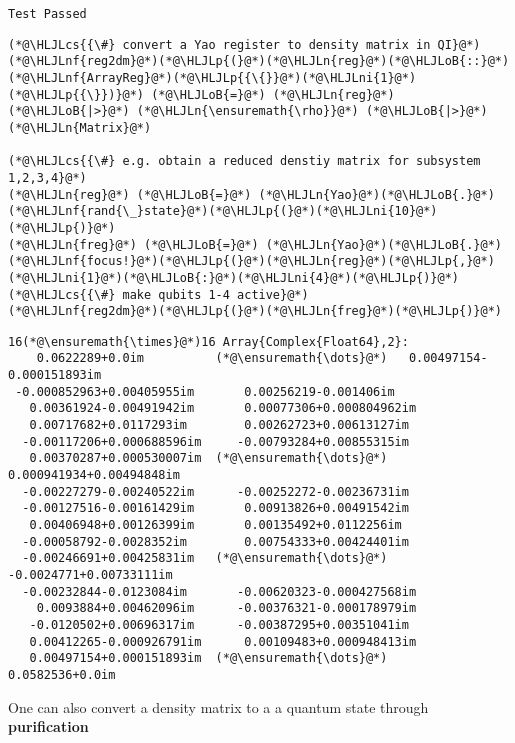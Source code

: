 \documentclass[11pt,a4paper]{article}
\newcommand{\HLJLn}[1]{#1}
\newcommand{\HLJLnf}[1]{\textcolor[RGB]{66,102,213}{#1}}
\newcommand{\HLJLni}[1]{\textcolor[RGB]{59,151,46}{#1}}
\newcommand{\HLJLoB}[1]{\textcolor[RGB]{102,102,102}{\textbf{#1}}}
\newcommand{\HLJLp}[1]{#1}
\newcommand{\HLJLcs}[1]{\textcolor[RGB]{153,153,119}{\textit{#1}}}
\begin{document}
\begin{lstlisting}
Test Passed
\end{lstlisting}


\begin{lstlisting}
(*@\HLJLcs{{\#} convert a Yao register to density matrix in QI}@*)
(*@\HLJLnf{reg2dm}@*)(*@\HLJLp{(}@*)(*@\HLJLn{reg}@*)(*@\HLJLoB{::}@*)(*@\HLJLnf{ArrayReg}@*)(*@\HLJLp{{\{}}@*)(*@\HLJLni{1}@*)(*@\HLJLp{{\}})}@*) (*@\HLJLoB{=}@*) (*@\HLJLn{reg}@*) (*@\HLJLoB{|>}@*) (*@\HLJLn{\ensuremath{\rho}}@*) (*@\HLJLoB{|>}@*) (*@\HLJLn{Matrix}@*)

(*@\HLJLcs{{\#} e.g. obtain a reduced denstiy matrix for subsystem 1,2,3,4}@*)
(*@\HLJLn{reg}@*) (*@\HLJLoB{=}@*) (*@\HLJLn{Yao}@*)(*@\HLJLoB{.}@*)(*@\HLJLnf{rand{\_}state}@*)(*@\HLJLp{(}@*)(*@\HLJLni{10}@*)(*@\HLJLp{)}@*)
(*@\HLJLn{freg}@*) (*@\HLJLoB{=}@*) (*@\HLJLn{Yao}@*)(*@\HLJLoB{.}@*)(*@\HLJLnf{focus!}@*)(*@\HLJLp{(}@*)(*@\HLJLn{reg}@*)(*@\HLJLp{,}@*) (*@\HLJLni{1}@*)(*@\HLJLoB{:}@*)(*@\HLJLni{4}@*)(*@\HLJLp{)}@*) (*@\HLJLcs{{\#} make qubits 1-4 active}@*)
(*@\HLJLnf{reg2dm}@*)(*@\HLJLp{(}@*)(*@\HLJLn{freg}@*)(*@\HLJLp{)}@*)
\end{lstlisting}

\begin{lstlisting}
16(*@\ensuremath{\times}@*)16 Array{Complex{Float64},2}:
    0.0622289+0.0im          (*@\ensuremath{\dots}@*)   0.00497154-0.000151893im
 -0.000852963+0.00405955im       0.00256219-0.001406im   
   0.00361924-0.00491942im       0.00077306+0.000804962im
   0.00717682+0.0117293im        0.00262723+0.00613127im 
  -0.00117206+0.000688596im     -0.00793284+0.00855315im 
   0.00370287+0.000530007im  (*@\ensuremath{\dots}@*)  0.000941934+0.00494848im 
  -0.00227279-0.00240522im      -0.00252272-0.00236731im 
  -0.00127516-0.00161429im       0.00913826+0.00491542im 
   0.00406948+0.00126399im       0.00135492+0.0112256im  
  -0.00058792-0.0028352im        0.00754333+0.00424401im 
  -0.00246691+0.00425831im   (*@\ensuremath{\dots}@*)   -0.0024771+0.00733111im 
  -0.00232844-0.0123084im       -0.00620323-0.000427568im
    0.0093884+0.00462096im      -0.00376321-0.000178979im
   -0.0120502+0.00696317im      -0.00387295+0.00351041im 
   0.00412265-0.000926791im      0.00109483+0.000948413im
   0.00497154+0.000151893im  (*@\ensuremath{\dots}@*)    0.0582536+0.0im
\end{lstlisting}


One can also convert a density matrix to a a quantum state through \textbf{purification}
\end{document}
